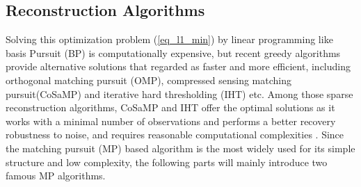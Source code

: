 \subsection{Reconstruction Algorithms}
Solving this optimization problem (\ref{eq_l1_min}) by linear programming like basis Pursuit (BP) is computationally expensive, but recent greedy algorithms provide alternative solutions that regarded as faster and more efficient, including orthogonal matching pursuit (OMP), compressed sensing matching pursuit(CoSaMP) and iterative hard thresholding (IHT) etc. Among those sparse reconstruction algorithms, CoSaMP and IHT offer the optimal solutions as it works with a minimal number of observations and performs a better recovery robustness to noise, and requires reasonable computational complexities \cite{needell2009cosamp}. Since the matching pursuit (MP) based algorithm is the most widely used for its simple structure and low complexity, the following parts will mainly introduce two famous MP algorithms.

